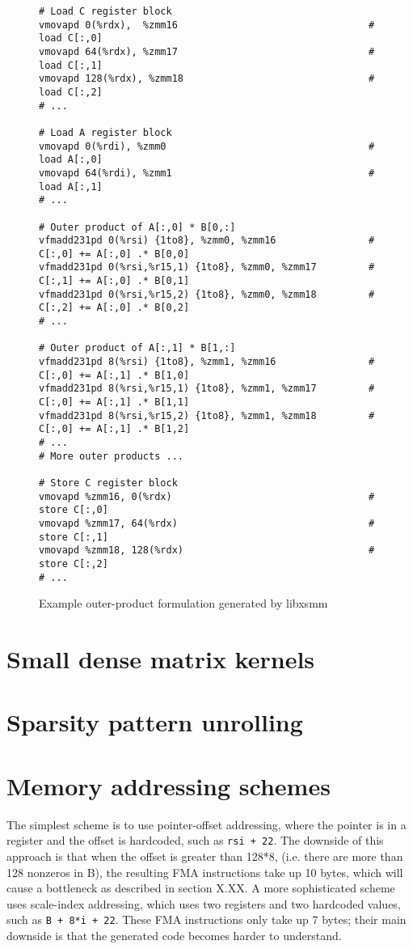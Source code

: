 \begin{figure}[ht]
\begin{verbatim}
# Load C register block
vmovapd 0(%rdx),  %zmm16                                 # load C[:,0]
vmovapd 64(%rdx), %zmm17                                 # load C[:,1]
vmovapd 128(%rdx), %zmm18                                # load C[:,2]
# ...

# Load A register block
vmovapd 0(%rdi), %zmm0                                   # load A[:,0]
vmovapd 64(%rdi), %zmm1                                  # load A[:,1]
# ...

# Outer product of A[:,0] * B[0,:]
vfmadd231pd 0(%rsi) {1to8}, %zmm0, %zmm16                # C[:,0] += A[:,0] .* B[0,0]
vfmadd231pd 0(%rsi,%r15,1) {1to8}, %zmm0, %zmm17         # C[:,1] += A[:,0] .* B[0,1]
vfmadd231pd 0(%rsi,%r15,2) {1to8}, %zmm0, %zmm18         # C[:,2] += A[:,0] .* B[0,2]
# ...

# Outer product of A[:,1] * B[1,:]
vfmadd231pd 8(%rsi) {1to8}, %zmm1, %zmm16                # C[:,0] += A[:,1] .* B[1,0]
vfmadd231pd 8(%rsi,%r15,1) {1to8}, %zmm1, %zmm17         # C[:,0] += A[:,1] .* B[1,1]
vfmadd231pd 8(%rsi,%r15,2) {1to8}, %zmm1, %zmm18         # C[:,0] += A[:,1] .* B[1,2]
# ...
# More outer products ...

# Store C register block
vmovapd %zmm16, 0(%rdx)                                  # store C[:,0]
vmovapd %zmm17, 64(%rdx)                                 # store C[:,1]
vmovapd %zmm18, 128(%rdx)                                # store C[:,2]
# ...
\end{verbatim}
\caption{Example outer-product formulation generated by libxsmm}
\label{fig:outerproduct}
\end{figure}

\section{Small dense matrix kernels}

\section{Sparsity pattern unrolling}

\section{Memory addressing schemes}

The simplest scheme is to use pointer-offset addressing, where the pointer is in a register and the offset is hardcoded, such as \texttt{rsi + 22}. The downside of this approach is that when the offset is greater than 128*8, (i.e. there are more than 128 nonzeros in B), the resulting FMA instructions take up 10 bytes, which will cause a bottleneck as described in section X.XX. A more sophisticated scheme uses scale-index addressing, which uses two registers and two hardcoded values, such as \texttt{B + 8*i + 22}. These FMA instructions only take up 7 bytes; their main downside is that the generated code becomes harder to understand.




